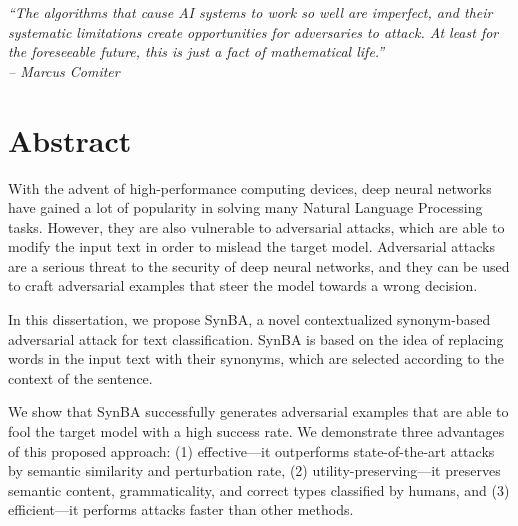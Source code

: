 
\cleardoublepage
{}
{}
\begin{flushright}{
	\slshape
	“The algorithms
	that cause AI systems
	to work so well are
	imperfect, and their
	systematic limitations
	create opportunities for
	adversaries to attack. At
	least for the foreseeable
	future, this is just a fact of
	mathematical life.”
	\\ – Marcus Comiter} \\


	\medskip

\end{flushright}


\begingroup
\let\clearpage\relax
\let\cleardoublepage\relax
\let\cleardoublepage\relax

\chapter*{Abstract}

With the advent of high-performance computing devices, deep neural networks have gained a lot of popularity in solving many Natural Language Processing tasks. 
However, they are also vulnerable to adversarial attacks, which are able to modify the input text in order to mislead the target model. 
Adversarial attacks are a serious threat to the security of deep neural networks, and they can be used to craft adversarial examples that steer the model towards a wrong decision.

In this dissertation, we propose SynBA, a novel contextualized synonym-based adversarial attack for text classification. 
SynBA is based on the idea of replacing words in the input text with their synonyms, which are selected according to the context of the sentence. 

We show that SynBA successfully generates adversarial examples that are able to fool the target model with a high success rate. 
We demonstrate three advantages of this proposed approach: (1) effective---it outperforms state-of-the-art attacks by semantic similarity and perturbation rate, (2) utility-preserving---it preserves semantic content, grammaticality, and correct types classified by humans, and (3) efficient---it performs attacks faster than other methods.


\endgroup

\vfill

